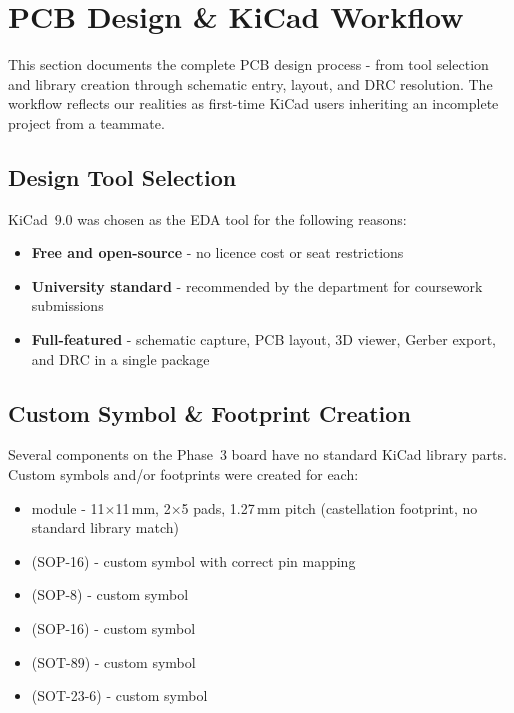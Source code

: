
\section{PCB Design \& KiCad Workflow}

This section documents the complete PCB design process - from tool selection
and library creation through schematic entry, layout, and DRC resolution.
The workflow reflects our realities as first-time KiCad users inheriting an
incomplete project from a teammate.

\subsection{Design Tool Selection}

KiCad~9.0 was chosen as the EDA tool for the following reasons:

\begin{itemize}[leftmargin=1.8em, itemsep=2pt]
  \item \textbf{Free and open-source} - no licence cost or seat restrictions
  \item \textbf{University standard} - recommended by the department for
        coursework submissions
  \item \textbf{Full-featured} - schematic capture, PCB layout, 3D viewer,
        Gerber export, and DRC in a single package
\end{itemize}


\subsection{Custom Symbol \& Footprint Creation}

Several components on the Phase~3 board have no standard KiCad library parts.
Custom symbols and/or footprints were created for each:

\begin{itemize}[leftmargin=1.8em, itemsep=2pt]
  \item {} module - 11$\times$11\,mm, 2$\times$5 pads,
        1.27\,mm pitch (castellation footprint, no standard library match)
  \item {} (SOP-16) - custom symbol with correct pin mapping
  \item {} (SOP-8) - custom symbol
  \item {} (SOP-16) - custom symbol
  \item {} (SOT-89) - custom symbol
  \item {} (SOT-23-6) - custom symbol
\end{itemize}

